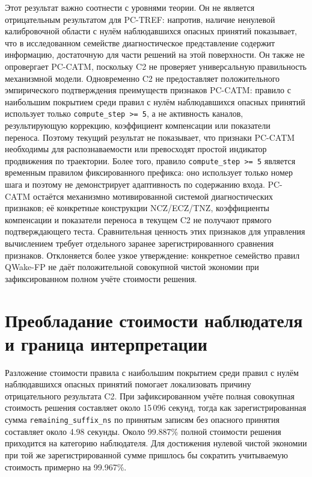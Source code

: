 Этот результат важно соотнести с уровнями теории. Он не является отрицательным
результатом для PC-TREF: напротив, наличие ненулевой калибровочной области с
нулём наблюдавшихся опасных принятий показывает, что в исследованном семействе
диагностическое представление содержит информацию, достаточную для части
решений на этой поверхности. Он также не опровергает
PC-CATM, поскольку C2 не проверяет универсальную правильность механизмной
модели. Одновременно C2 не предоставляет положительного эмпирического
подтверждения преимуществ признаков PC-CATM: правило с наибольшим покрытием
среди правил с нулём наблюдавшихся опасных принятий использует только
\texttt{compute\_step >= 5}, а не активность каналов, результирующую коррекцию,
коэффициент компенсации или показатели переноса. Поэтому текущий результат не
показывает, что признаки PC-CATM необходимы для распознаваемости или превосходят
простой индикатор продвижения по траектории. Более того, правило
\texttt{compute\_step >= 5} является временным правилом фиксированного префикса:
оно использует только номер шага и поэтому не демонстрирует адаптивность по
содержанию входа. PC-CATM остаётся механизмно мотивированной системой диагностических
признаков; её конкретные конструкции NCZ/ECZ/TNZ, коэффициенты компенсации и
показатели переноса в текущем C2 не получают прямого подтверждающего теста.
Сравнительная ценность этих признаков для управления вычислением требует
отдельного заранее зарегистрированного сравнения признаков. Отклоняется более узкое утверждение:
конкретное семейство правил QWake-FP не даёт положительной совокупной чистой
экономии при зафиксированном полном учёте стоимости решения.

\section{Преобладание стоимости наблюдателя и граница интерпретации}
\label{sec:discussion-observer-cost}

Разложение стоимости правила с наибольшим покрытием среди правил с нулём
наблюдавшихся опасных принятий помогает локализовать причину отрицательного
результата C2. При зафиксированном учёте полная совокупная стоимость решения
составляет около 15\,096 секунд, тогда как зарегистрированная сумма
\texttt{remaining\_suffix\_ns} по принятым записям без опасного принятия составляет около
4.98 секунды. Около 99.887\% полной стоимости решения приходится на категорию
наблюдателя. Для достижения нулевой чистой экономии при той же зарегистрированной
сумме пришлось бы сократить учитываемую стоимость примерно на 99.967\%.

